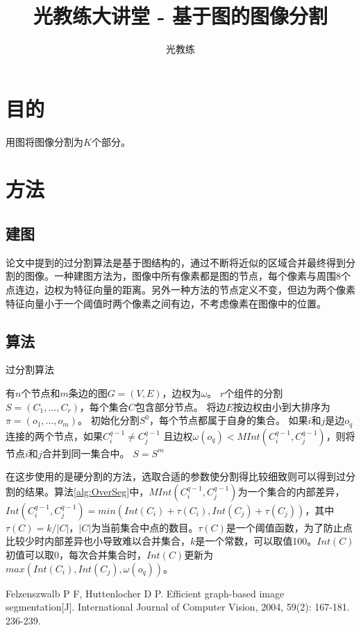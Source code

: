\documentclass[11pt, a4paper]{article}
\begin{document}
\begin{CJK}{UTF8}{song}
\title{光教练大讲堂 - 基于图的图像分割}
\author{光教练}
\maketitle
\section{目的}
用图将图像分割为$K$个部分。
\section{方法}
\subsection{建图}
论文\cite{Bib_Segment}中提到的过分割算法是基于图结构的，通过不断将近似的区域合并最终得到分割的图像。一种建图方法为，图像中所有像素都是图的节点，每个像素与周围8个点连边，边权为特征向量的距离。另外一种方法的节点定义不变，但边为两个像素特征向量小于一个阈值时两个像素之间有边，不考虑像素在图像中的位置。
\subsection{算法}
\begin{algorithm}
\caption{过分割算法}
\label{alg:OverSeg}
\begin{algorithmic}[1]
\REQUIRE
有$n$个节点和$m$条边的图$G=(V, E)$，边权为$\omega$。
\ENSURE
$r$个组件的分割$S=(C_1,...,C_r)$，每个集合$C$包含部分节点。
\STATE 将边$E$按边权由小到大排序为$\pi=(o_1, ..., o_m)$。
\STATE 初始化分割$S^0$，每个节点都属于自身的集合。
\STATE 如果$i$和$j$是边$o_q$连接的两个节点，如果$C_{i}^{q-1} \neq C_{j}^{q-1}$ 且边权$\omega(o_q)<MInt(C_i^{q-1}, C_j^{q-1})$，则将节点$i$和$j$合并到同一集合中。
\ENDFOR
\RETURN $S=S^m$
\end{algorithmic}
\end{algorithm}
在这步使用的是硬分割的方法，选取合适的参数使分割得比较细致则可以得到过分割的结果。算法\ref{alg:OverSeg}中，$MInt(C_i^{q-1}, C_j^{q-1})$为一个集合的内部差异，$Int(C_i^{q-1}, C_j^{q-1})=min(Int(C_i)+\tau(C_i), Int(C_j)+\tau(C_j))$，其中$\tau(C)=k/|C|$，$|C|$为当前集合中点的数目。$\tau(C)$是一个阈值函数，为了防止点比较少时内部差异也小导致难以合并集合，$k$是一个常数，可以取值100。$Int(C)$初值可以取0，每次合并集合时，$Int(C)$更新为$max(Int(C_i), Int(C_j), \omega(o_q))$。
\begin{thebibliography}{0}
	 Felzenszwalb P F, Huttenlocher D P. Efficient graph-based image segmentation[J]. International Journal of Computer Vision, 2004, 59(2): 167-181. 236-239.
\end{thebibliography}
\end{CJK}
\end{document}
